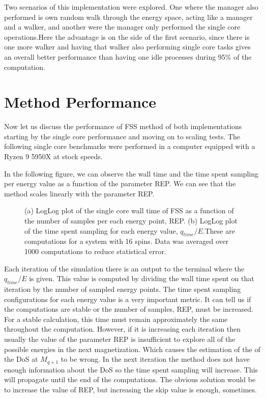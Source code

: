 	Two scenarios of this implementation were explored. One where the manager also performed is own random walk through the energy space, acting like a manager and a walker, and another were the manager only performed the single core operations.Here the advantage is on the side of the first scenario, since there is one more walker and having that walker also performing single core tasks gives an overall better performance than having one idle processes during 95\% of the computation.


\section{Method Performance}

	Now let us discuss the performance of FSS method of both implementations starting by the single core performance and moving on to scaling tests. The following single core benchmarks were performed in a computer equipped with a Ryzen 9 5950X at stock speeds.  
	
	In the following figure, we can observe the wall time and the time spent sampling per energy value as a function of the parameter REP. We can see that the method scales linearly with the parameter REP. 
	
\begin{figure}[ht]
\centering
{}
\quad
\quad
\quad
{}	

\caption{(a) LogLog plot of the single core wall time of FSS as a function of the number of samples per each energy point, REP.  (b) LogLog plot of the time spent sampling for each energy value, $q_{time}/E$.These are computations for a system with 16 spins. Data was averaged over 1000 computations to reduce statistical error.}
\end{figure}

Each iteration of the simulation there is an output to the terminal where the $q_{time}/E$ is given. This value is computed by dividing the wall time spent on that iteration by the number of sampled energy points. 
The time spent sampling configurations for each energy value is a very important metric. It can tell us if the computations are stable or the number of samples, REP, must be increased. 
For a stable calculation, this time must remain approximately the same throughout the computation. However, if it is increasing each iteration then usually the value of the parameter REP is insufficient to explore all of the possible energies in the next magnetization. Which causes the estimation of the of the DoS at $M_{q+1}$ to be wrong. In the next iteration the method does not have enough information about the DoS so the time spent sampling will increase. This will propagate until the end of the computations. The obvious solution would be to increase the value of REP, but increasing the skip value is enough, sometimes.

